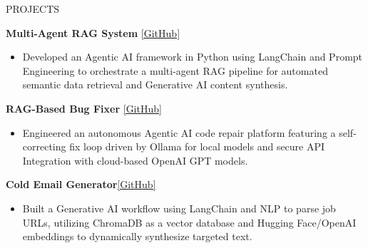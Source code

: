\documentclass{resume}
\begin{document}
\begin{rSection}{PROJECTS}

\textbf{Multi-Agent RAG System} \href{https://github.com/Dhruvsoni4125/Multi-Agent-Rag-System}{[GitHub]}

\begin{itemize}
\item Developed an Agentic AI framework in Python using LangChain and Prompt Engineering to orchestrate a multi-agent RAG pipeline for automated semantic data retrieval and Generative AI content synthesis.
\end{itemize}
\textbf{RAG-Based Bug Fixer} \href{https://github.com/Dhruvsoni4125/Bug-Fixer}{[GitHub]}

\begin{itemize}
\item Engineered an autonomous Agentic AI code repair platform featuring a self-correcting fix loop driven by Ollama for local models and secure API Integration with cloud-based OpenAI GPT models.
\end{itemize}
\textbf{Cold Email Generator}\href{https://github.com/Dhruvsoni4125/ColdEmailGenerator}{[GitHub]}

\begin{itemize}
\item Built a Generative AI workflow using LangChain and NLP to parse job URLs, utilizing ChromaDB as a vector database and Hugging Face/OpenAI embeddings to dynamically synthesize targeted text.
\end{itemize}

\end{rSection}
\end{document}
